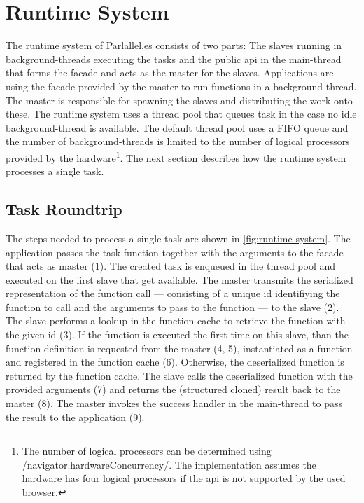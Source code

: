 \section{Runtime System}\label{sec:runtime-system}
The runtime system of Parlallel.es consists of two parts: The slaves running in background-threads executing the tasks and the public api in the main-thread that forms the facade and acts as the master for the slaves. Applications are using the facade provided by the master to run functions in a background-thread. The master is responsible for spawning the slaves and distributing the work onto these. The runtime system uses a thread pool that queues task in the case no idle background-thread is available. The default thread pool uses a FIFO queue and the number of background-threads is limited to the number of logical processors provided by the hardware\footnote{The number of logical processors can be determined using \javascriptinline/navigator.hardwareConcurrency/. The implementation assumes the hardware has four logical processors if the api is not supported by the used browser.}. The next section describes how the runtime system processes a single task. 

\subsection{Task Roundtrip}
The steps needed to process a single task are shown in \cref{fig:runtime-system}. The application passes the task-function together with the arguments to the facade that acts as master (1). The created task is enqueued in the thread pool and executed on the first slave that get available. The master transmits the serialized representation of the function call --- consisting of a unique id identifiying the function to call and the arguments to pass to the function --- to the slave (2). The slave performs a lookup in the function cache to retrieve the function with the given id (3). If the function is executed the first time on this slave, than the function definition is requested from the master (4, 5), instantiated as a function and registered in the function cache (6). Otherwise, the deserialized function is returned by the function cache. The slave calls the deserialized function with the provided arguments (7) and returns the (structured cloned) result back to the master (8). The master invokes the success handler in the main-thread to pass the result to the application (9). 

